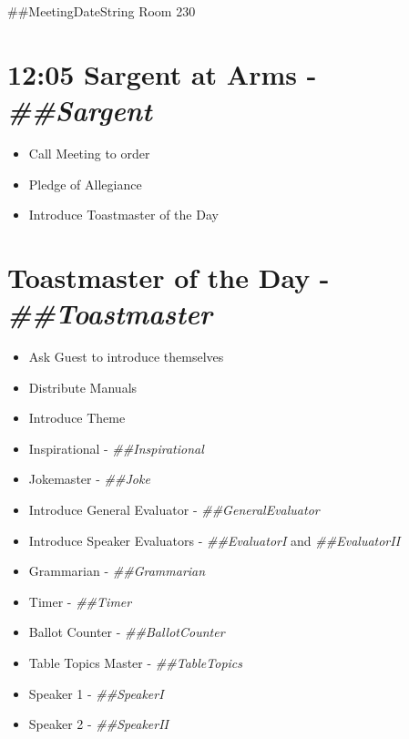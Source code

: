 \documentclass{article}
\newcommand{\meetingDateString}{##MeetingDateString}
\newcommand{\toastmaster}{##Toastmaster}
\newcommand{\sargent}{##Sargent}
\newcommand{\tableTopics}{##TableTopics}
\newcommand{\generalEvaluator}{##GeneralEvaluator}
\newcommand{\evaluatorI}{##EvaluatorI}
\newcommand{\evaluatorII}{##EvaluatorII}
\newcommand{\speakerI}{##SpeakerI}
\newcommand{\speakerII}{##SpeakerII}
\newcommand{\grammarian}{##Grammarian}
\newcommand{\timer}{##Timer}
\newcommand{\inspirational}{##Inspirational}
\newcommand{\ballotCounter}{##BallotCounter}
\newcommand{\joke}{##Joke}
\begin{document}
{}
{}
{\centering \meetingDateString{} Room 230 \\}

\begin{spacing}{.6}

\section*{12:05 Sargent at Arms - \textit{\sargent{}}}
\begin{itemize}
  \item Call Meeting to order
  \item Pledge of Allegiance
  \item Introduce Toastmaster of the Day
\end{itemize}

\section*{Toastmaster of the Day - \textit{\toastmaster{}}} 
\begin{itemize}
  \item Ask Guest to introduce themselves
  \item Distribute Manuals
  \item Introduce Theme
  \item Inspirational - \textit{\inspirational{}}
  \item Jokemaster - \textit{\joke{}}
  \item Introduce General Evaluator - \textit{\generalEvaluator{}}
  \item Introduce Speaker Evaluators - \textit{\evaluatorI{}} and \textit{\evaluatorII{}}
  \item Grammarian - \textit{\grammarian{}}
  \item Timer - \textit{\timer{}}
  \item Ballot Counter - \textit{\ballotCounter{}}
  \item Table Topics Master - \textit{\tableTopics{}}
  \item Speaker 1 - \textit{\speakerI{}}
  \item Speaker 2 - \textit{\speakerII{}}
\end{itemize}


\end{spacing}
\end{document}
